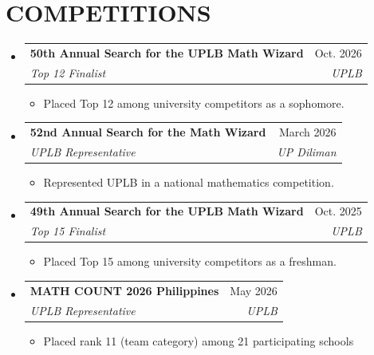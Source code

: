 \documentclass[letterpaper,11pt]{article}
\makeatletter
\newcommand{\resumeItem}[1]{
  \item \small{#1}
}
\newcommand{\resumeSubheading}[4]{
\item
\begin{tabular*}{\textwidth}{l@{\extracolsep{\fill}}r}
\textbf{#1} & {\small #2} \\
\textit{#3} & \textit{\small #4} \\
\end{tabular*}
}
\makeatother
\begin{document}
\section{COMPETITIONS}
\begin{itemize}[leftmargin=0in, label={}]

\resumeSubheading
{50th Annual Search for the UPLB Math Wizard}{Oct. 2026}{Top 12 Finalist}{UPLB}
\begin{itemize}
    \item Placed Top 12 among university competitors as a sophomore.

\end{itemize}

\resumeSubheading
{52nd Annual Search for the Math Wizard}{March 2026}
{UPLB Representative}{UP Diliman}
\begin{itemize}
\resumeItem{Represented UPLB in a national mathematics competition.}
\end{itemize}

\newpage
\resumeSubheading
{49th Annual Search for the UPLB Math Wizard}{Oct. 2025}
{Top 15 Finalist}{UPLB}
\begin{itemize}
\resumeItem{Placed Top 15 among university competitors as a freshman.}
\end{itemize}

\resumeSubheading
{MATH COUNT 2026 Philippines}{May 2026}
{UPLB Representative}{UPLB}
\begin{itemize}
\resumeItem{Placed rank 11 (team category) among 21 participating schools}

\end{itemize}
\vspace{-5pt}
\end{itemize}
\end{document}
